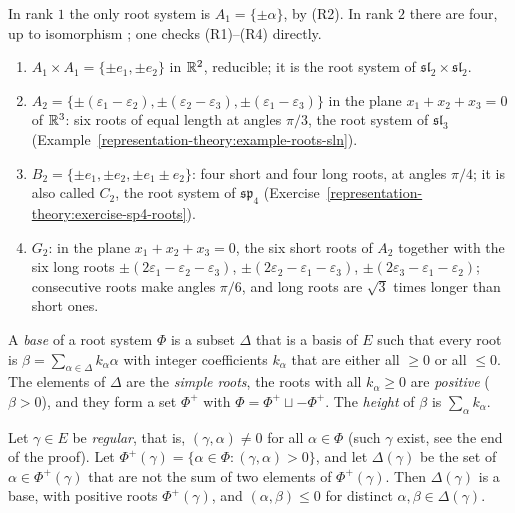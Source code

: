 \begin{example}\label{representation-theory:example-rank-two}
In rank $1$ the only root system is $A_1 = \{\pm\alpha\}$, by (R2). In rank $2$ there are four, up to isomorphism \cite[Section 9.3]{humphreys-lie}; one checks (R1)--(R4) directly.
\begin{enumerate}
\item $A_1 \times A_1 = \{\pm e_1, \pm e_2\}$ in $\mathbb{R}^2$, reducible; it is the root system of $\mathfrak{sl}_2 \times \mathfrak{sl}_2$.
\item $A_2 = \{\pm(\varepsilon_1 - \varepsilon_2), \pm(\varepsilon_2 - \varepsilon_3), \pm(\varepsilon_1 - \varepsilon_3)\}$ in the plane $x_1 + x_2 + x_3 = 0$ of $\mathbb{R}^3$: six roots of
equal length at angles $\pi/3$, the root system of $\mathfrak{sl}_3$ (Example~\ref{representation-theory:example-roots-sln}).
\item $B_2 = \{\pm e_1, \pm e_2, \pm e_1 \pm e_2\}$: four short and four long roots, at angles $\pi/4$; it is also called $C_2$, the root system of $\mathfrak{sp}_4$
(Exercise~\ref{representation-theory:exercise-sp4-roots}).
\item $G_2$: in the plane $x_1 + x_2 + x_3 = 0$, the six short roots of $A_2$ together with the six long roots $\pm(2\varepsilon_1 - \varepsilon_2 - \varepsilon_3)$,
$\pm(2\varepsilon_2 - \varepsilon_1 - \varepsilon_3)$, $\pm(2\varepsilon_3 - \varepsilon_1 - \varepsilon_2)$; consecutive roots make angles $\pi/6$, and long roots are $\sqrt3$ times
longer than short ones.
\end{enumerate}
\end{example}

\begin{definition}\label{representation-theory:definition-base}
A \emph{base} of a root system $\Phi$ is a subset $\Delta$ that is a basis of $E$ such that every root is $\beta = \sum_{\alpha \in \Delta}k_\alpha\alpha$ with integer coefficients $k_\alpha$
that are either all $\geq 0$ or all $\leq 0$. The elements of $\Delta$ are the \emph{simple roots}, the roots with all $k_\alpha \geq 0$ are \emph{positive} ($\beta > 0$), and they form a
set $\Phi^+$ with $\Phi = \Phi^+ \sqcup -\Phi^+$. The \emph{height} of $\beta$ is $\sum_\alpha k_\alpha$.
\end{definition}

\begin{theorem}\label{representation-theory:theorem-bases-exist}
Let $\gamma \in E$ be \emph{regular}, that is, $(\gamma, \alpha) \neq 0$ for all $\alpha \in \Phi$ (such $\gamma$ exist, see the end of the proof). Let
$\Phi^+(\gamma) = \{\alpha \in \Phi : (\gamma, \alpha) > 0\}$, and let $\Delta(\gamma)$ be the set of $\alpha \in \Phi^+(\gamma)$ that are not the sum of two elements of
$\Phi^+(\gamma)$. Then $\Delta(\gamma)$ is a base, with positive roots $\Phi^+(\gamma)$, and $(\alpha, \beta) \leq 0$ for distinct $\alpha, \beta \in \Delta(\gamma)$.
\end{theorem}

